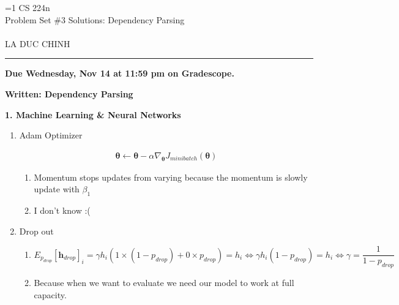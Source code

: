 \documentclass{article}
\def\solutions{1}
\newcommand{\ruleskip}{\bigskip\hrule\bigskip}
\begin{document}
\pagestyle{myheadings} 

\ifnum\solutions=1 {
	{\huge\noindent CS 224n\\
		Problem Set \#3 Solutions: Dependency Parsing}\\\\
	LA DUC CHINH
}  \fi

\ruleskip

{\bf Due Wednesday, Nov 14 at 11:59 pm on Gradescope.}

\medskip

\textbf{Written: Dependency Parsing}

\textbf{1. Machine Learning \& Neural Networks}

\begin{enumerate}[label=(\alph*)]
	\item Adam Optimizer
	
	\begin{align}
	\bm{\theta} \leftarrow\bm{\theta} - \alpha \nabla_{\bm{\theta}} J_{minibatch}(\bm{\theta})
	\end{align}
	
	\begin{enumerate}[label=\roman*.]
		
		\item Momentum stops updates from varying because the momentum is slowly update with $\beta_{1}$ 
		\item I don't know :(
		
	\end{enumerate}

	\item Drop out
	
	\begin{enumerate}[label=\roman*.]
		
		\item \begin{equation*}
		E_{p_{drop}}[\bm{h}_{drop}]_{i} = \gamma h_{i} (1 \times (1 - p_{drop}) + 0 \times p_{drop}) = h_{i}
		\iff \gamma h_{i}(1- p_{drop}) = h_{i}
		\iff \gamma = \frac{1}{1-p_{drop}}
		\end{equation*}
		\item Because when we want to evaluate we need our model to work at full capacity.
		
	\end{enumerate}
	
\end{enumerate}
\end{document}
